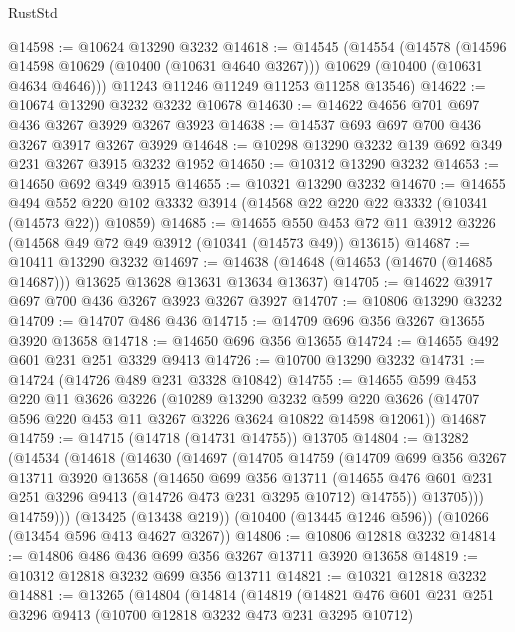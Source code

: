 \begin{lexlean}{RustStd}
\begin{coremodule}
{\begin{coremodule}
{{{{{{{{{{{{{{{{{{{{{{{{{@14598 := @10624 @13290 @3232
@14618 := @14545
    (@14554
      (@14578
        (@14596 @14598 @10629 (@10400 (@10631 @4640 @3267)))
        @10629
        (@10400 (@10631 @4634 @4646)))
      @11243
      @11246
      @11249
      @11253
      @11258
      @13546)
@14622 := @10674 @13290 @3232 @3232 @10678
@14630 := @14622 @4656 @701 @697 @436 @3267 @3929 @3267 @3923
@14638 := @14537 @693 @697 @700 @436 @3267 @3917 @3267 @3929
@14648 := @10298 @13290 @3232 @139 @692 @349 @231 @3267 @3915 @3232 @1952
@14650 := @10312 @13290 @3232
@14653 := @14650 @692 @349 @3915
@14655 := @10321 @13290 @3232
@14670 := @14655
    @494
    @552
    @220
    @102
    @3332
    @3914
    (@14568 @22 @220 @22 @3332 (@10341 (@14573 @22)) @10859)
@14685 := @14655
    @550
    @453
    @72
    @11
    @3912
    @3226
    (@14568 @49 @72 @49 @3912 (@10341 (@14573 @49)) @13615)
@14687 := @10411 @13290 @3232
@14697 := @14638 (@14648 (@14653 (@14670 (@14685 @14687))) @13625 @13628 @13631 @13634 @13637)
@14705 := @14622 @3917 @697 @700 @436 @3267 @3923 @3267 @3927
@14707 := @10806 @13290 @3232
@14709 := @14707 @486 @436
@14715 := @14709 @696 @356 @3267 @13655 @3920 @13658
@14718 := @14650 @696 @356 @13655
@14724 := @14655 @492 @601 @231 @251 @3329 @9413
@14726 := @10700 @13290 @3232
@14731 := @14724 (@14726 @489 @231 @3328 @10842)
@14755 := @14655
    @599
    @453
    @220
    @11
    @3626
    @3226
    (@10289
      @13290
      @3232
      @599
      @220
      @3626
      (@14707 @596 @220 @453 @11 @3267 @3226 @3624 @10822 @14598 @12061))
    @14687
@14759 := @14715 (@14718 (@14731 @14755)) @13705
@14804 := @13282
    (@14534
      (@14618
        (@14630
          (@14697
            (@14705
              @14759
              (@14709
                @699
                @356
                @3267
                @13711
                @3920
                @13658
                (@14650
                  @699
                  @356
                  @13711
                  (@14655 @476 @601 @231 @251 @3296 @9413 (@14726 @473 @231 @3295 @10712) @14755))
                @13705)))
          @14759)))
    (@13425 (@13438 @219))
    (@10400 (@13445 @1246 @596))
    (@10266 (@13454 @596 @413 @4627 @3267))
@14806 := @10806 @12818 @3232
@14814 := @14806 @486 @436 @699 @356 @3267 @13711 @3920 @13658
@14819 := @10312 @12818 @3232 @699 @356 @13711
@14821 := @10321 @12818 @3232
@14881 := @13265
    (@14804
      (@14814
        (@14819
          (@14821
            @476
            @601
            @231
            @251
            @3296
            @9413
            (@10700 @12818 @3232 @473 @231 @3295 @10712)
}}}}}}}}}}}}}}}}}}}}}}}}}
\end{coremodule}}
\end{coremodule}
\end{lexlean}

